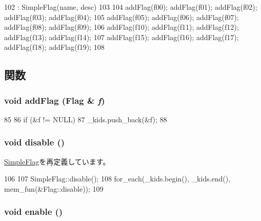 \begin{DoxyCode}
102         : SimpleFlag(name, desc)
103     {
104         addFlag(f00); addFlag(f01); addFlag(f02); addFlag(f03); addFlag(f04);
105         addFlag(f05); addFlag(f06); addFlag(f07); addFlag(f08); addFlag(f09);
106         addFlag(f10); addFlag(f11); addFlag(f12); addFlag(f13); addFlag(f14);
107         addFlag(f15); addFlag(f16); addFlag(f17); addFlag(f18); addFlag(f19);
108     }
\end{DoxyCode}


\subsection{関数}
\hypertarget{classDebug_1_1CompoundFlag_a667690869b46bb35864d6169181e3b60}{
\subsubsection[{addFlag}]{\setlength{\rightskip}{0pt plus 5cm}void addFlag ({\bf Flag} \& {\em f})}}
\label{classDebug_1_1CompoundFlag_a667690869b46bb35864d6169181e3b60}



\begin{DoxyCode}
85     {
86         if (&f != NULL)
87             _kids.push_back(&f);
88     }
\end{DoxyCode}
\hypertarget{classDebug_1_1CompoundFlag_a8cfbbe53c1cf6e3054736daea3044c0f}{
\subsubsection[{disable}]{\setlength{\rightskip}{0pt plus 5cm}void disable ()}}
\label{classDebug_1_1CompoundFlag_a8cfbbe53c1cf6e3054736daea3044c0f}


\hyperlink{classDebug_1_1SimpleFlag_a8cfbbe53c1cf6e3054736daea3044c0f}{SimpleFlag}を再定義しています。


\begin{DoxyCode}
106 {
107     SimpleFlag::disable();
108     for_each(_kids.begin(), _kids.end(), mem_fun(&Flag::disable));
109 }
\end{DoxyCode}
\hypertarget{classDebug_1_1CompoundFlag_a486f22824bd83c5308a0d70ffac6f758}{
\subsubsection[{enable}]{\setlength{\rightskip}{0pt plus 5cm}void enable ()}}
\label{classDebug_1_1CompoundFlag_a486f22824bd83c5308a0d70ffac6f758}


